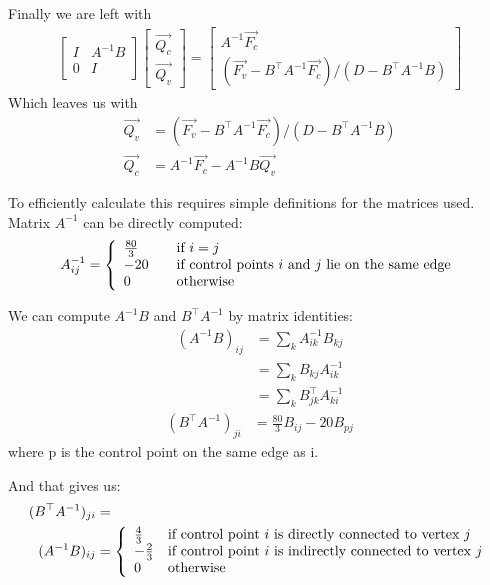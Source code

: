 \documentclass{article}
\begin{document}
Finally we are left with
\begin{align*}
\begin{bmatrix} 
I & A^{-1}B \\ 
0 & I
\end{bmatrix} 
\begin{bmatrix} 
\vec{Q_c} \\ 
\vec{Q_v}
\end{bmatrix}
=
\begin{bmatrix} 
A^{-1}\vec{F_c} \\ 
(\vec{F_v} - B^{\top}A^{-1}\vec{F_c})/(D - B^{\top}A^{-1}B)
\end{bmatrix}
\end{align*}
Which leaves us with
\begin{align*}
\vec{Q_v} &= (\vec{F_v} - B^{\top}A^{-1}\vec{F_c})/(D - B^{\top}A^{-1}B)\\
\vec{Q_c} &= A^{-1}\vec{F_c} - A^{-1}B \vec{Q_{v}}  
\end{align*}

To efficiently calculate this requires simple definitions for the matrices used.
Matrix $A^{-1}$ can be directly computed:
\begin{align*}
A^{-1}_{ij} = \left\{ 
  \begin{array}{l l}
    \frac{80}{3} & \quad \text{if $i=j$}\\
    -20 & \quad \text{if control points $i$ and $j$ lie on the same edge}\\
    0 & \quad \text{otherwise}\\
  \end{array} \right.
\end{align*}

We can compute $A^{-1}B$ and $B^{\top}A^{-1}$ by matrix identities:
\begin{align*}
(A^{-1}B)_{ij} &=  \sum_{k} A^{-1}_{ik} B_{kj} \\
&=  \sum_{k} B_{kj} A^{-1}_{ik} \\ 
&=  \sum_{k} B^{\top}_{jk} A^{-1}_{ki}
\end{align*} 
\begin{align*}
(B^{\top} A^{-1})_{ji} &=  \frac{80}{3} B_{ij} - 20 B_{pj}
\end{align*} 
where p is the control point on the same edge as i.

And that gives us:
\begin{align*}	
(B^{\top}A^{-1})_{ji} &=\\
(A^{-1}B)_{ij} &= \left\{ 
  \begin{array}{l l}
    \frac{4}{3} & \text{if control point $i$ is directly connected to vertex $j$}\\
    -\frac{2}{3} & \text{if control point $i$ is indirectly connected to vertex $j$}\\
    0 & \text{otherwise}\\
  \end{array} \right.  \\ 
\end{align*}
\end{document}
